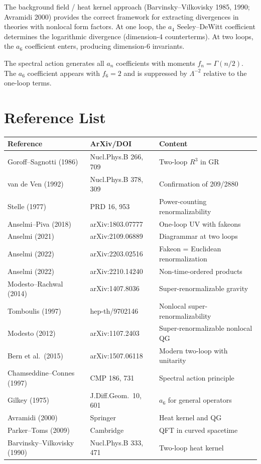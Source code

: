 \documentclass[12pt,a4paper]{article}
\begin{document}
The background field / heat kernel approach (Barvinsky--Vilkovisky 1985,
1990; Avramidi 2000) provides the correct framework for extracting
divergences in theories with nonlocal form factors. At one loop, the
$a_4$ Seeley--DeWitt coefficient determines the logarithmic divergence
(dimension-4 counterterms). At two loops, the $a_6$ coefficient enters,
producing dimension-6 invariants.

The spectral action generates all $a_n$ coefficients with moments
$f_n = \Gamma(n/2)$. The $a_6$ coefficient appears with $f_6 = 2$
and is suppressed by $\Lambda^{-2}$ relative to the one-loop terms.

\section{Reference List}

\begin{longtable}{p{5cm}p{4cm}p{5cm}}
\toprule
Reference & ArXiv/DOI & Content \\
\midrule
\endhead
Goroff--Sagnotti (1986) & Nucl.Phys.B 266, 709 & Two-loop $R^3$ in GR \\
van de Ven (1992) & Nucl.Phys.B 378, 309 & Confirmation of 209/2880 \\
Stelle (1977) & PRD 16, 953 & Power-counting renormalizability \\
Anselmi--Piva (2018) & arXiv:1803.07777 & One-loop UV with fakeons \\
Anselmi (2021) & arXiv:2109.06889 & Diagrammar at two loops \\
Anselmi (2022) & arXiv:2203.02516 & Fakeon = Euclidean renormalization \\
Anselmi (2022) & arXiv:2210.14240 & Non-time-ordered products \\
Modesto--Rachwal (2014) & arXiv:1407.8036 & Super-renormalizable gravity \\
Tomboulis (1997) & hep-th/9702146 & Nonlocal super-renormalizability \\
Modesto (2012) & arXiv:1107.2403 & Super-renormalizable nonlocal QG \\
Bern et al.\ (2015) & arXiv:1507.06118 & Modern two-loop with unitarity \\
Chamseddine--Connes (1997) & CMP 186, 731 & Spectral action principle \\
Gilkey (1975) & J.Diff.Geom.\ 10, 601 & $a_6$ for general operators \\
Avramidi (2000) & Springer & Heat kernel and QG \\
Parker--Toms (2009) & Cambridge & QFT in curved spacetime \\
Barvinsky--Vilkovisky (1990) & Nucl.Phys.B 333, 471 & Two-loop heat kernel \\
\bottomrule
\end{longtable}
\end{document}

